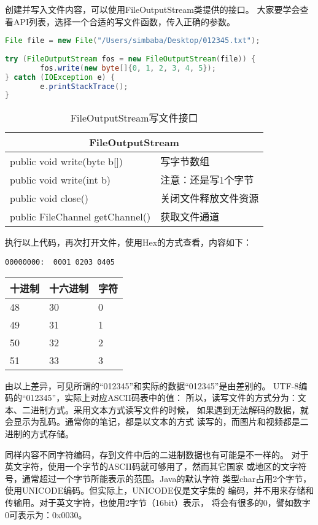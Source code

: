创建并写入文件内容，可以使用FileOutputStream类提供的接口。
大家要学会查看API列表，选择一个合适的写文件函数，传入正确的参数。

\begin{lstlisting}[language=Java]
File file = new File("/Users/simbaba/Desktop/012345.txt");
       
try (FileOutputStream fos = new FileOutputStream(file)) {
		fos.write(new byte[]{0, 1, 2, 3, 4, 5});
} catch (IOException e) {
		e.printStackTrace();
}
\end{lstlisting}

\begin{table}[!htbp]\centering
	\begin{tabular}{|p{7cm}|p{5.2cm}|}
	\hline
	\multicolumn{2}{|c|}{FileOutputStream}\\
	\hline
	public void write(byte b[])&写字节数组\\
	public void write(int b) &注意：还是写1个字节\\
	public void close() &关闭文件释放文件资源\\
	public FileChannel getChannel() &获取文件通道\\
	\hline
	\end{tabular}
	\caption{FileOutputStream写文件接口}
\end{table}

\noindent
执行以上代码，再次打开文件，使用Hex的方式查看，内容如下：
\begin{lstlisting}
00000000:  0001 0203 0405          
\end{lstlisting}

\begin{table}[!htbp]\centering
	\begin{tabular}{|p{2cm}|p{2cm}|p{2cm}|}
	\hline
	十进制&十六进制&字符\\
	\hline
	48&30&0\\
	49&31&1\\
	50&32&2\\
	51&33&3\\
	\hline
	\end{tabular}
\end{table}

由以上差异，可见所谓的“012345”和实际的数据“012345”是由差别的。
UTF-8编码的“012345”，实际上对应ASCII码表中的值：
所以，读写文件的方式分为：文本、二进制方式。采用文本方式读写文件的时候，
如果遇到无法解码的数据，就会显示为乱码。通常你的笔记，都是以文本的方式
读写的，而图片和视频都是二进制的方式存储。

同样内容不同字符编码，存到文件中后的二进制数据也有可能是不一样的。
对于英文字符，使用一个字节的ASCII码就可够用了，然而其它国家
或地区的文字符号，通常超过一个字节所能表示的范围。Java的默认字符
类型char占用2个字节，使用UNICODE编码。但实际上，UNICODE仅是文字集的
编码，并不用来存储和传输用。对于英文字符，也使用2字节（16bit）表示，
将会有很多的0，譬如数字0可表示为：0x0030。

